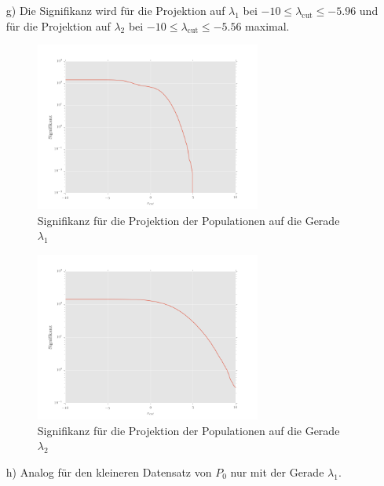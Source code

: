 \begin{itemize}
\item[g)] Die Signifikanz wird für die Projektion auf $\lambda_1$ bei $-10 \leq \lambda_{\text{cut}} \leq -5.96$ und für die Projektion auf $\lambda_2$ bei $-10 \leq \lambda_{\text{cut}} \leq -5.56$ maximal.
\begin{figure}[H]
	\centering
	\includegraphics[width=0.7\textwidth]{signifikanz.png}
	\caption{Signifikanz für die Projektion der Populationen auf die Gerade $\lambda_1$}
\end{figure}
\begin{figure}[H]
	\centering
	\includegraphics[width=0.7\textwidth]{signifikanz2.png}
	\caption{Signifikanz für die Projektion der Populationen auf die Gerade $\lambda_2$}
\end{figure}

\item[h)] Analog für den kleineren Datensatz von $P_0$ nur mit der Gerade $\lambda_1$.


\end{itemize}
